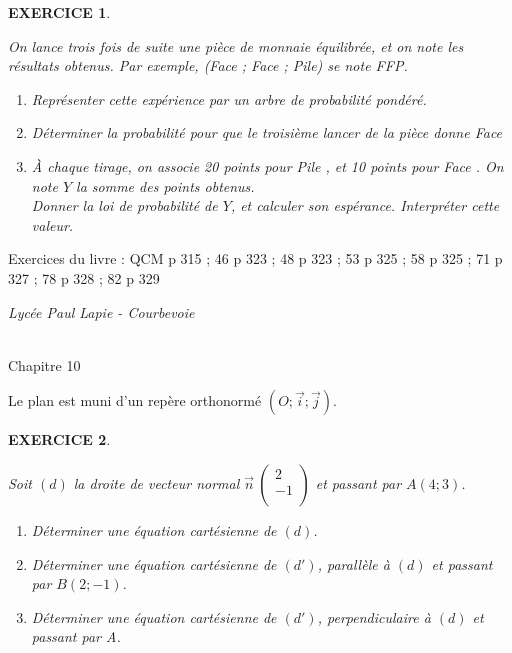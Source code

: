 \documentclass[a4paper]{article}   %
\renewcommand{\(}{\left(}
\renewcommand{\)}{\right)}
\newtheorem{EXO}{\large EXERCICE }
\newenvironment{EX}   { \setcounter{ques}{0} \begin{EXO} \hrulefill ~\vspace{0.3cm}

\normalfont}    {\end{EXO} \medskip}
\newcommand{\ri}{$\left(O;\vec{i};\vec{j}\right)$}
\def\v{\overrightarrow}	%
\def\cl{{\large \bf{1èreG1}}}
\begin{document}
\begin{EX} On lance trois fois de suite une pièce de monnaie équilibrée, et on note les résultats obtenus. Par exemple, (Face ; Face ; Pile) se note FFP. \begin{enumerate}
\item Représenter cette expérience par un arbre de probabilité pondéré.
\item Déterminer la probabilité pour que le troisième lancer de la pièce donne \og Face \fg{} 
\item \`A chaque tirage, on associe 20 points pour \og Pile \fg{} , et 10 points pour \og Face \fg{} . On note $Y$ la somme des points obtenus. \\
Donner la loi de probabilité de $Y$, et calculer son espérance. Interpréter cette valeur.
\end{enumerate}
\end{EX}
Exercices du livre : QCM p 315 ; 46 p 323 ; 48 p 323 ; 53 p 325 ; 58 p 325 ; 71 p 327 ; 78 p 328 ; 82 p 329




\newpage \setcounter{EXO}{0} 

\noindent\begin{minipage}{.20\linewidth}\begin{center}                  
\noindent \emph{Lycée Paul Lapie - Courbevoie}
\end{center}\end{minipage}
\begin{minipage}{1.5\linewidth}\begin{center}	
\noindent \cl\\ Chapitre 10
\end{center}\end{minipage}

\begin{center} 	
\end{center}

Le plan est muni d'un repère orthonormé \ri.

\begin{EX} Soit $(d)$ la droite de vecteur normal $\v{n} ~\left(\begin{array}{c}
	2 \\
	 -1\\
\end{array} \right)$ et passant par $A(4;3)$. 
\begin{enumerate}
\item Déterminer une équation cartésienne de $(d)$.
\item Déterminer une équation cartésienne de $(d')$, parallèle à $(d)$ et passant par $B(2;-1)$.
\item Déterminer une équation cartésienne de $(d')$, perpendiculaire à $(d)$ et passant par A.
\end{enumerate}

\end{EX}
\end{document}
